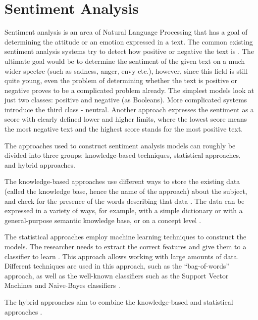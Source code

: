\section{Sentiment Analysis}
\label{sec:sentiment_analysis}

Sentiment analysis is an area of Natural Language Processing that has a goal of determining the attitude or an emotion expressed in a text. The common existing sentiment analysis systems try to detect how positive or negative the text is \cite{yi2003sentiment}. The ultimate goal would be to determine the sentiment of the given text on a much wider spectre (such as sadness, anger, envy etc.), however, since this field is still quite young, even the problem of determining whether the text is positive or negative proves to be a complicated problem already. The simplest models look at just two classes: positive and negative (as Booleans). More complicated systems introduce the third class - neutral. Another approach expresses the sentiment as a score with clearly defined lower and higher limits, where the lowest score means the most negative text and the highest score stands for the most positive text.

The approaches used to construct sentiment analysis models can roughly be divided into three groups: knowledge-based techniques, statistical approaches, and hybrid approaches. 

The knowledge-based approaches use different ways to store the existing data (called the knowledge base, hence the name of the approach) about the subject, and check for the presence of the words describing that data \cite{chaumartin2007upar7}. The data can be expressed in a variety of ways, for example, with a simple dictionary or with a general-purpose semantic knowledge base, or on a concept level \cite{cambria2013knowledge}. 

The statistical approaches employ machine learning techniques to construct the models. The researcher needs to extract the correct features and give them to a classifier to learn \cite{cambria2013statistical}. This approach allows working with large amounts of data. Different techniques are used in this approach, such as the ``bag-of-words'' approach, as well as the well-known classifiers such as the Support Vector Machines and Naive-Bayes classifiers \cite{mullen2004sentiment, tan2009adapting}.

The hybrid approaches aim to combine the knowledge-based and statistical approaches \cite{ghiassi2013twitter}. 

